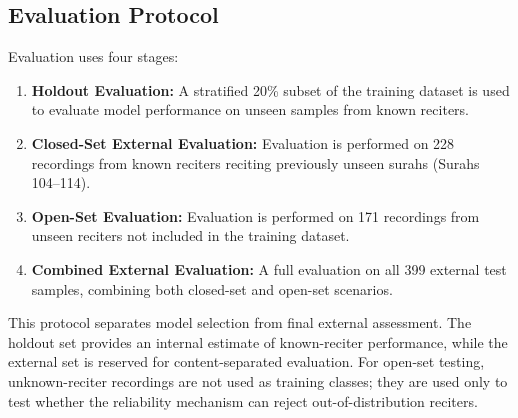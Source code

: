 \documentclass[a4paper,conference]{IEEEtran}
\begin{document}
\begin{table}[htbp]
\centering
\caption{Model training configurations for Random Forest and BLSTM classifiers.}
\label{table2}
\renewcommand{\arraystretch}{1.2}
\setlength{\tabcolsep}{4pt}
\end{table}

\subsection{Evaluation Protocol}

Evaluation uses four stages:

\begin{enumerate}
\item \textbf{Holdout Evaluation:} A stratified 20\% subset of the training dataset is used to evaluate model performance on unseen samples from known reciters.
\item \textbf{Closed-Set External Evaluation:} Evaluation is performed on 228 recordings from known reciters reciting previously unseen surahs (Surahs 104--114).
\item \textbf{Open-Set Evaluation:} Evaluation is performed on 171 recordings from unseen reciters not included in the training dataset.
\item \textbf{Combined External Evaluation:} A full evaluation on all 399 external test samples, combining both closed-set and open-set scenarios.
\end{enumerate}

This protocol separates model selection from final external assessment. The holdout set provides an internal estimate of known-reciter performance, while the external set is reserved for content-separated evaluation. For open-set testing, unknown-reciter recordings are not used as training classes; they are used only to test whether the reliability mechanism can reject out-of-distribution reciters.
\end{document}
